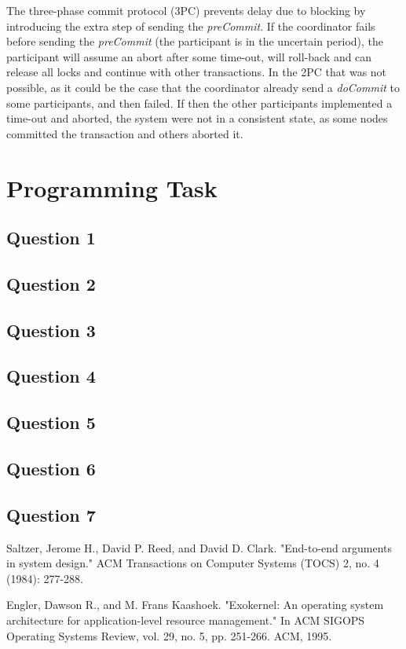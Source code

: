 \documentclass[12pt,a4paper,fleqn]{article}
\begin{document}
The three-phase commit protocol (3PC) prevents delay due to blocking by introducing the extra step of sending the \emph{preCommit}. If the coordinator fails before sending the \emph{preCommit} (the participant is in the uncertain period), the participant will assume an abort after some time-out, will roll-back and can release all locks and continue with other transactions. In the 2PC that was not possible, as it could be the case that the coordinator already send a \emph{doCommit} to some participants, and then failed. If then the other participants implemented a time-out and aborted, the system were not in a consistent state, as some nodes committed the transaction and others aborted it.

\section*{Programming Task} 
\label{sec:programming}

\subsection*{Question 1}
\label{sec:pq1}

\subsection*{Question 2}
\label{sec:pq2}

\subsection*{Question 3}
\label{sec:pq3}

\subsection*{Question 4}
\label{sec:pq4}

\subsection*{Question 5}
\label{sec:pq5}

\subsection*{Question 6}
\label{sec:pq6}

\subsection*{Question 7}
\label{sec:pq7}
 

\begin{thebibliography}{1}

 Saltzer, Jerome H., David P. Reed, and David D. Clark. "End-to-end arguments in system design." ACM Transactions on Computer Systems (TOCS) 2, no. 4 (1984): 277-288.

 Engler, Dawson R., and M. Frans Kaashoek. "Exokernel: An operating system architecture for application-level resource management." In ACM SIGOPS Operating Systems Review, vol. 29, no. 5, pp. 251-266. ACM, 1995.

\end{thebibliography}
\end{document}
